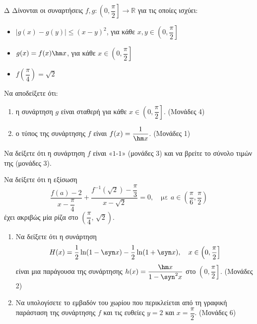 \begin{thema}{Δ}
Δίνονται οι συναρτήσεις $f, g: \left(0, \dfrac{\pi}{2}\right] \to \mathbb{R}$ για τις οποίες ισχύει:
\begin{itemize}
    \item $\bigl|g(x) - g(y)\bigr| \leq (x-y)^2$, για κάθε $x, y \in \left(0, \dfrac{\pi}{2}\right]$
    \item $g(x) = f(x)\hm x$, για κάθε $x \in \left(0, \dfrac{\pi}{2}\right]$
    \item $f\!\left(\dfrac{\pi}{4}\right) = \sqrt{2}$
\end{itemize}
\begin{erwthma}
    \item Να αποδείξετε ότι:
    \begin{enumerate}[label=\roman*)]
        \item η συνάρτηση $g$ είναι σταθερή για κάθε $x \in \left(0, \dfrac{\pi}{2}\right]$. \hfill (Μονάδες 4)
        \item ο τύπος της συνάρτησης $f$ είναι $f(x) = \dfrac{1}{\hm x}$. \hfill (Μονάδες 1)
    \end{enumerate}

    \item Να δείξετε ότι η συνάρτηση $f$ είναι «$1$-$1$» (μονάδες 3) και να βρείτε το σύνολο τιμών της (μονάδες 3). 

    \item Να δείξετε ότι η εξίσωση
    \[
    \frac{f(a) - 2}{x - \dfrac{\pi}{4}} + \frac{f^{-1}(\sqrt{2}) - \dfrac{\pi}{3}}{x - \sqrt{2}} = 0, \quad \text{με } a \in \left(\frac{\pi}{6}, \frac{\pi}{2}\right)
    \]
    έχει ακριβώς μία ρίζα στο $\left(\dfrac{\pi}{4},\, \sqrt{2}\right)$. 

    \item
    \begin{enumerate}[label=\roman*)]
        \item Να δείξετε ότι η συνάρτηση
        \[
        H(x) = \frac{1}{2}\ln(1 - \syn x) - \frac{1}{2}\ln(1 + \syn x), \quad x \in \left(0, \frac{\pi}{2}\right]
        \]
        είναι μια παράγουσα της συνάρτησης $h(x) = \dfrac{\hm x}{1 - \syn^2 x}$ στο $\left(0, \dfrac{\pi}{2}\right]$. \hfill (Μονάδες 2)

        \item Να υπολογίσετε το εμβαδόν του χωρίου που περικλείεται από τη γραφική παράσταση της συνάρτησης $f$ και τις ευθείες $y = 2$ και $x = \dfrac{\pi}{2}$. \hfill (Μονάδες 6)
    \end{enumerate}
\end{erwthma}
\end{thema}


